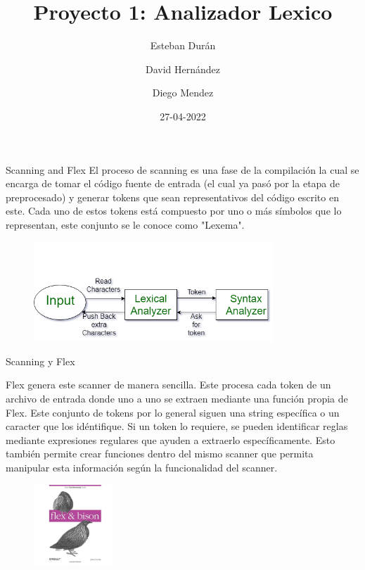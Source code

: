 \documentclass[xcolor={dvipsnames}]{beamer}
\title[Analizador Lexico\hspace{0.5cm}\insertframenumber/\inserttotalframenumber]{Proyecto 1: Analizador Lexico }
\author{ Esteban Durán \and David Hernández  \and Diego Mendez   }
\institute{Instuto Tecnológico De Costa Rica\\ Compiladores e Intérpretes}
\date{27-04-2022}
\begin{document}
\begin{frame}
  \titlepage
\end{frame}

\begin{frame}{Scanning and Flex}
El proceso de scanning es una fase de la compilación la cual se encarga de tomar el código fuente de entrada (el cual ya pasó por la etapa de preprocesado) y generar tokens que sean representativos del código escrito en este. Cada uno de estos tokens está compuesto por uno o más símbolos que lo representan, este conjunto se le conoce como "Lexema".
\begin{figure}
\includegraphics[width=9cm]{phases.png}
\end{figure}
  \end{frame}


\begin{frame}{Scanning y Flex}


  Flex genera este scanner de manera sencilla. Este procesa cada token de un archivo de entrada donde uno a uno se extraen mediante una función propia de Flex. Este conjunto de tokens por lo general siguen una string específica o un caracter que los idéntifique. Si un token lo requiere, se pueden identificar reglas mediante expresiones regulares que ayuden a extraerlo específicamente. Esto también permite crear funciones dentro del mismo scanner que permita manipular esta información según la funcionalidad del scanner.
  \begin{figure}
\includegraphics[width=3cm]{flex.jpg}
\end{figure}

\end{frame}

\end{document}
